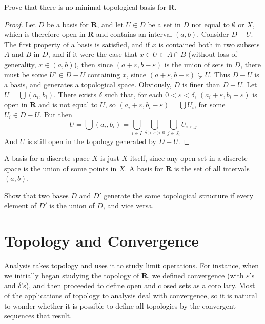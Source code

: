 \begin{example}
\begin{exercise}
    Prove that there is no minimal topological basis for $\mathbf{R}$.
\end{exercise}
\begin{proof}
    Let $D$ be a basis for $\mathbf{R}$, and let $U \in D$ be a set in $D$ not equal to $\emptyset$ or $X$, which is therefore open in $\mathbf{R}$ and contains an interval $(a,b)$. Consider $D - U$. The first property of a basis is satisfied, and if $x$ is contained both in two subsets $A$ and $B$ in $D$, and if it were the case that $x \in U \subset A \cap B$ (without loss of generality, $x \in (a,b)$), then since $(a + \varepsilon,b - \varepsilon)$ is the union of sets in $D$, there must be some $U' \in D - U$ containing $x$, since $(a + \varepsilon, b - \varepsilon) \subsetneq U$. Thus $D - U$ is a basis, and generates a topological space. Obviously, $D$ is finer than $D -U$. Let $U = \bigcup (a_i, b_i)$. There exists $\delta$ such that, for each $0 < \varepsilon < \delta$, $(a_i + \varepsilon, b_i - \varepsilon)$ is open in $\mathbf{R}$ and is not equal to $U$, so $(a_i + \varepsilon, b_i - \varepsilon) = \bigcup U_i$, for some $U_i \in D - U$. But then
    \[ U = \bigcup (a_i, b_i) = \bigcup_{i \in I} \bigcup_{\delta > \varepsilon > 0} \bigcup_{j \in J_i} U_{i,\varepsilon,j} \]
    And $U$ is still open in the topology generated by $D - U$.
\end{proof}

A basis for a discrete space $X$ is just $X$ itself, since any open set in a discrete space is the union of some points in $X$. A basis for $\mathbf{R}$ is the set of all intervals $(a,b)$.

\begin{exercise}
    Show that two bases $D$ and $D'$ generate the same topological structure if every element of $D'$ is the union of $D$, and vice versa.
\end{exercise}

\section{Topology and Convergence}

Analysis takes topology and uses it to study limit operations. For instance, when we initially began studying the topology of $\mathbf{R}$, we defined convergence (with $\varepsilon$'s and $\delta$'s), and then proceeded to define open and closed sets as a corollary. Most of the applications of topology to analysis deal with convergence, so it is natural to wonder whether it is possible to define all topologies by the convergent sequences that result.


\end{example}
